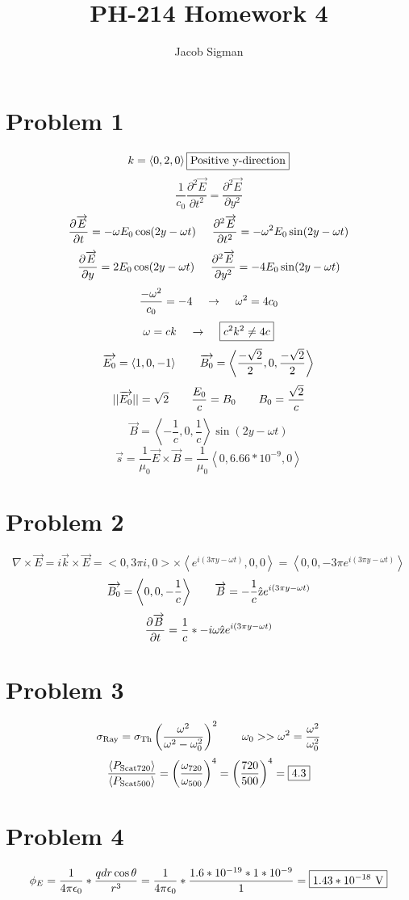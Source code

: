\documentclass{article}
\title{PH-214 Homework 4}
\author{Jacob Sigman}
\date{}
\begin{document}
\maketitle
\section*{Problem 1}
\[k=\left<0,2,0\right>\boxed{\textnormal{Positive y-direction}}\]
\[\frac{1}{c_0}\frac{\partial^2\overrightarrow{E}}{\partial t^2}=\frac{\partial^2\overrightarrow{E}}{\partial y^2}\]
\[\frac{\partial\overrightarrow{E}}{\partial t}=-\omega E_0\cos(2y-\omega t)\hspace{5 mm}\frac{\partial^2\overrightarrow{E}}{\partial t^2}=-\omega^2 E_0\sin(2y-\omega t)\]
\[\frac{\partial\overrightarrow{E}}{\partial y}=2E_0\cos(2y-\omega t)\hspace{5 mm}\frac{\partial^2\overrightarrow{E}}{\partial y^2}=-4E_0\sin(2y-\omega t)\]
\[\frac{-\omega^2}{c_0}=-4\hspace{4 mm}\rightarrow\hspace{4 mm}\omega^2=4c_0\]
\[\omega=ck\hspace{4 mm}\rightarrow\hspace{4 mm}\boxed{c^2k^2\neq4c}\]
\[\overrightarrow{E_0}=\left<1,0,-1\right>\hspace{7 mm}\overrightarrow{B_0}=\left<\frac{-\sqrt2}{2},0,\frac{-\sqrt2}{2}\right>\]
\[||\overrightarrow{E_0}||=\sqrt2\hspace{7 mm}\frac{E_0}{c}=B_0\hspace{7 mm}B_0=\frac{\sqrt2}{c}\]
\[\boxed{\overrightarrow{B}=\left<-\frac{1}{c},0,\frac{1}{c}\right>\sin(2y-\omega t)}\]
\[\overrightarrow{s}=\frac{1}{\mu_0}\overrightarrow{E}\times\overrightarrow{B}=\boxed{\frac{1}{\mu_0}\left<0,6.66*10^{-9},0\right>}\]
\section*{Problem 2}
\[\nabla\times\overrightarrow{E}=i\overrightarrow{k}\times\overrightarrow{E}=<0,3\pi i,0>\times\left<e^{i(3\pi y-\omega t)},0,0\right>=\left<0,0,-3\pi e^{i(3\pi y-\omega t)}\right>\]
\[\overrightarrow{B_0}=\left<0,0,-\frac{1}{c}\right>\hspace{7 mm}\overrightarrow{B}=-\frac{1}{c}\hat{\textnormal{z}}e^{i(3\pi y-\omega t)}\]
\[\frac{\partial\overrightarrow{B}}{\partial t}=\frac{1}{c}*-i\omega\hat{\textnormal{z}}e^{i(3\pi y-\omega t)}\]
\section*{Problem 3}
\[\sigma_\textnormal{Ray}=\sigma_\textnormal{Th}\left(\frac{\omega^2}{\omega^2-\omega_0^2}\right)^2\hspace{7 mm}\omega_0 >> \omega^2=\frac{\omega^2}{\omega_0^2}\]
\[\frac{\left<P_{\textnormal{Scat720}}\right>}{\left<P_{\textnormal{Scat500}}\right>}=\left(\frac{\omega_{720}}{\omega_{500}}\right)^4=\left(\frac{720}{500}\right)^4=\boxed{4.3}\]
\section*{Problem 4}
\[\phi_E=\frac{1}{4\pi\epsilon_0}*\frac{qdr\cos\theta}{r^3}=\frac{1}{4\pi\epsilon_0}*\frac{1.6*10^{-19}*1*10^{-9}}{1}=\boxed{1.43*10^{-18}\textnormal{ V}}\]
\end{document}
